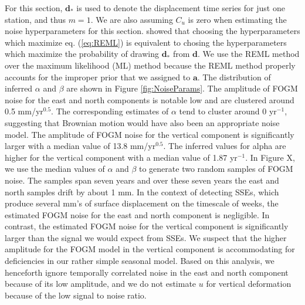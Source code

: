 \documentclass[10pt,a4paper]{article}
\begin{document}
For this section, $\bm{d}_*$ is used to denote the displacement time series for just one station, and thus $m = 1$. We are also assuming $C_u$ is zero when estimating the noise hyperparameters for this section. \citet{Harville1974} showed that choosing the hyperparameters which maximize eq. (\ref{eq:REML}) is equivalent to chosing the hyperparameters which maximize the probability of drawing $\bm{d}_*$ from $\bm{d}$.  We use the REML method over the maximum likelihood (ML) method \citep[e.g.,][]{Langbein1997} because the REML method properly accounts for the improper prior that we assigned to $\bm{a}$. The distribution of inferred $\alpha$ and $\beta$ are shown in Figure \ref{fig:NoiseParams}. The amplitude of FOGM noise for the east and north components is notable low and are clustered around 0.5 mm/yr$^{0.5}$. The corresponding estimates of $\alpha$ tend to cluster around 0 yr$^{-1}$, suggesting that Brownian motion would have also been an appropriate noise model.  The amplitude of FOGM noise for the vertical component is significantly larger with a median value of 13.8 mm/yr$^{0.5}$. The inferred values for alpha are higher for the vertical component with a median value of 1.87 yr$^{-1}$. In Figure X, we use the median values of $\alpha$ and $\beta$ to generate two random samples of FOGM noise. The samples span seven years and over these seven years the east and north samples drift by about 1 mm. In the context of detecting SSEs, which produce several mm's of surface displacement on the timescale of weeks, the estimated FOGM noise for the east and north component is negligible. In contrast, the estimated FOGM noise for the vertical component is significantly larger than the signal we would expect from SSEs. We suspect that the higher amplitude for the FOGM model in the vertical component is accommodating for deficiencies in our rather simple seasonal model. Based on this analysis, we henceforth ignore temporally correlated noise in the east and north component because of its low amplitude, and we do not estimate $u$ for vertical deformation because of the low signal to noise ratio.
\end{document}
